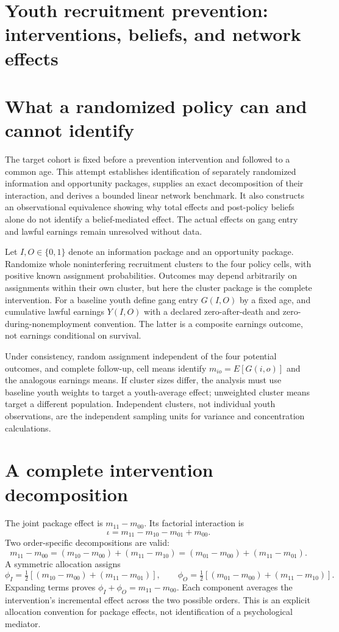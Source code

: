 \documentclass[11pt,a4paper]{article}
\begin{document}
\section*{Youth recruitment prevention: interventions, beliefs, and network effects}
\section{What a randomized policy can and cannot identify}
The target cohort is fixed before a prevention intervention and followed to a common age. This attempt establishes identification of separately randomized information and opportunity packages, supplies an exact decomposition of their interaction, and derives a bounded linear network benchmark. It also constructs an observational equivalence showing why total effects and post-policy beliefs alone do not identify a belief-mediated effect. The actual effects on gang entry and lawful earnings remain unresolved without data.

Let $I,O\in\{0,1\}$ denote an information package and an opportunity package. Randomize whole noninterfering recruitment clusters to the four policy cells, with positive known assignment probabilities. Outcomes may depend arbitrarily on assignments within their own cluster, but here the cluster package is the complete intervention. For a baseline youth define gang entry $G(I,O)$ by a fixed age, and cumulative lawful earnings $Y(I,O)$ with a declared zero-after-death and zero-during-nonemployment convention. The latter is a composite earnings outcome, not earnings conditional on survival.

Under consistency, random assignment independent of the four potential outcomes, and complete follow-up, cell means identify $m_{io}=E[G(i,o)]$ and the analogous earnings means. If cluster sizes differ, the analysis must use baseline youth weights to target a youth-average effect; unweighted cluster means target a different population. Independent clusters, not individual youth observations, are the independent sampling units for variance and concentration calculations.

\section{A complete intervention decomposition}
The joint package effect is $m_{11}-m_{00}$. Its factorial interaction is
\[
 \iota=m_{11}-m_{10}-m_{01}+m_{00}.
\]
Two order-specific decompositions are valid:
\[
 m_{11}-m_{00}=(m_{10}-m_{00})+(m_{11}-m_{10})
 =(m_{01}-m_{00})+(m_{11}-m_{01}).
\]
A symmetric allocation assigns
\[
 \phi_I=\tfrac12[(m_{10}-m_{00})+(m_{11}-m_{01})],\qquad
 \phi_O=\tfrac12[(m_{01}-m_{00})+(m_{11}-m_{10})]. \tag{1}
\]
Expanding terms proves $\phi_I+\phi_O=m_{11}-m_{00}$. Each component averages the intervention's incremental effect across the two possible orders. This is an explicit allocation convention for package effects, not identification of a psychological mediator.
\end{document}
